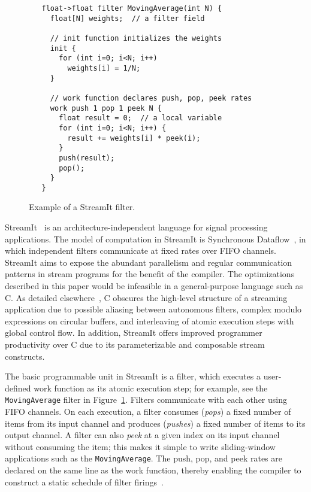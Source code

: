 \begin{figure}[t]
\vspace{6pt}
{\small
\begin{verbatim}
   float->float filter MovingAverage(int N) {
     float[N] weights;  // a filter field

     // init function initializes the weights
     init {
       for (int i=0; i<N; i++)
         weights[i] = 1/N;
     }

     // work function declares push, pop, peek rates
     work push 1 pop 1 peek N {
       float result = 0;  // a local variable
       for (int i=0; i<N; i++) {
         result += weights[i] * peek(i);
       }
       push(result);
       pop();
     }
   } 
\end{verbatim}
\vspace{-12pt}
\caption{Example of a StreamIt filter.\protect\label{fig:filter-example}}}
\vspace{-6pt}
\end{figure}

\label{sec:background}

StreamIt~\cite{streamitcc} is an architecture-independent language for
signal processing applications.  The model of computation in StreamIt
is Synchronous Dataflow~\cite{lee87static}, in which independent
filters communicate at fixed rates over FIFO channels.  StreamIt aims
to expose the abundant parallelism and regular communication patterns
in stream programs for the benefit of the compiler.  The optimizations
described in this paper would be infeasible in a general-purpose
language such as C.  As detailed elsewhere~\cite{streamitcc}, C
obscures the high-level structure of a streaming application due to
possible aliasing between autonomous filters, complex modulo
expressions on circular buffers, and interleaving of atomic execution
steps with global control flow.
In addition, StreamIt offers improved programmer productivity over C
due to its parameterizable and composable stream constructs.

The basic programmable unit in StreamIt is a filter, which executes a
user-defined work function as its atomic execution step; for example,
see the {\tt MovingAverage} filter in Figure~\ref{fig:filter-example}.
Filters communicate with each other using FIFO channels.  On each
execution, a filter consumes ({\it pops}) a fixed number of items from
its input channel and produces ({\it pushes}) a fixed number of items
to its output channel.  A filter can also {\it peek} at a given index
on its input channel without consuming the item; this makes it simple
to write sliding-window applications such as the {\tt MovingAverage}.
The push, pop, and peek rates are declared on the same line as the
work function, thereby enabling the compiler to construct a static
schedule of filter firings~\cite{lee87static}.

